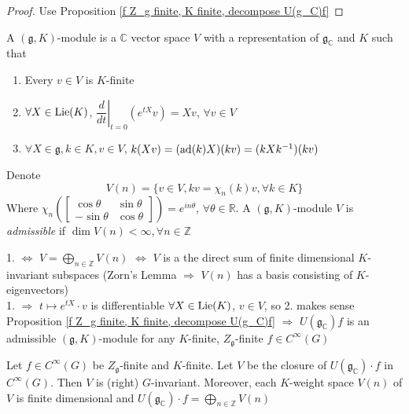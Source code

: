 \documentclass[main]{subfiles}
\begin{document}
\begin{proof}
Use Proposition \ref{f Z_g finite, K finite, decompose U(g_C)f}
\end{proof}

\begin{definition}\label{(g,k)-modules}
A $(\mathfrak g,K)$-module is a $\mathbb C$ vector space $V$ with a representation of $\mathfrak g_{\mathbb C}$ and $K$ such that
\begin{enumerate}
\item Every $v\in V$ is $K$-finite
\item $\forall X\in\operatorname{Lie}(K)$, $\left.\dfrac{d}{dt}\right|_{t=0}(e^{tX}v)=Xv$, $\forall v\in V$
\item $\forall X\in\mathfrak g,k\in K,v\in V$, $k(Xv)=(\operatorname{ad}(k)X)(kv)=(kXk^{-1})(kv)$
\end{enumerate}
Denote
\[V(n)=\{v\in V,kv=\chi_n(k)v,\forall k\in K\}\]
Where $\chi_n\left(\begin{bmatrix}
\cos\theta&\sin\theta\\
-\sin\theta&\cos\theta
\end{bmatrix}\right)=e^{in\theta}$, $\forall \theta\in\mathbb R$. A $(\mathfrak g,K)$-module $V$ is \textit{admissible} if $\dim V(n)<\infty,\forall n\in\mathbb Z$
\end{definition}

\begin{remark}
1. $\iff$ $V=\bigoplus_{n\in\mathbb Z}V(n)$ $\iff$ $V$ is a the direct sum of finite dimensional $K$-invariant subspaces (Zorn's Lemma $\Rightarrow$ $V(n)$ has a basis consisting of $K$-eigenvectors) \\
1. $\Rightarrow$ $t\mapsto e^{tX}\cdot v$ is differentiable $\forall X\in\operatorname{Lie}(K)$, $v\in V$, so 2. makes sense \\
Proposition \ref{f Z_g finite, K finite, decompose U(g_C)f} $\Rightarrow$ $U(\mathfrak g_{\mathbb C})f$ is an admissible $(\mathfrak g,K)$-module for any $K$-finite, $Z_{\mathfrak g}$-finite $f\in C^\infty(G)$
\end{remark}

\begin{proposition}\label{f Z_g finite, K finite, decompose U(g_C)f}
Let $f\in C^\infty(G)$ be $Z_{\mathfrak g}$-finite and $K$-finite. Let $V$ be the closure of $U(\mathfrak{g}_{\mathbb C})\cdot f$ in $C^\infty(G)$. Then $V$ is (right) $G$-invariant. Moreover, each $K$-weight space $V(n)$ of $V$ is finite dimensional and $U(\mathfrak g_{\mathbb C})\cdot f=\bigoplus_{n\in\mathbb Z}V(n)$
\end{proposition}
\end{document}
